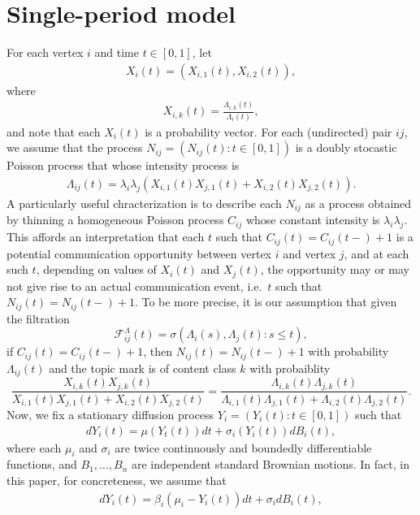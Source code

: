 \documentclass[12pt]{article}%
\begin{document}
\section{Single-period model}
For each vertex $i$ and time $t\in[0,1]$, let 
\begin{eqnarray}
X_i(t) = (X_{i,1}(t), X_{i,2}(t)),
\end{eqnarray}
where
\begin{eqnarray}
X_{i,k}(t) = \frac{\Lambda_{i,k}(t)}{\Lambda_i(t)},
\end{eqnarray}
and note that each $X_i(t)$ is a probability vector. 
For each (undirected) pair $ij$, we assume that 
the process $N_{ij} = (N_{ij}(t):t\in[0,1])$ is   
a doubly stocastic Poisson process that whose intensity process is  
\begin{eqnarray}
\Lambda_{ij}(t) = \lambda_i \lambda_j (X_{i,1}(t)X_{j,1}(t) + X_{i,2}(t)X_{j,2}(t)).
\end{eqnarray}
A particularly useful chracterization is to describe each $N_{ij}$ as a process obtained 
by thinning a homogeneous Poisson process $C_{ij}$ whose constant intensity is $\lambda_i \lambda_j$.  
This affords an interpretation that each $t$ such that $C_{ij}(t) = C_{ij}(t-) +1$ 
is a potential communication opportunity between vertex $i$ and vertex $j$, 
and at each such $t$, depending on values of $X_i(t)$ and $X_j(t)$, 
the opportunity may or may not give rise to an actual communication event, i.e.\ $t$ such that $N_{ij}(t) = N_{ij}(t-) +1$. To be more precise, it is our assumption that given the filtration 
$$
\mathcal F_{ij}^\Lambda(t) = \sigma(\Lambda_i(s), \Lambda_j(t): s \le t), 
$$
if $C_{ij}(t) = C_{ij}(t-)+1$, then
$N_{ij}(t) = N_{ij}(t-) + 1$ with probability $\Lambda_{ij}(t)$ and the topic mark is of content class $k$ with probaiblity 
$$
\frac{X_{i,k}(t)X_{j,k}(t)}{X_{i,1}(t)X_{j,1}(t) + X_{i,2}(t)X_{j,2}(t)}
=
\frac{\Lambda_{i,k}(t)\Lambda_{j,k}(t)}{\Lambda_{i,1}(t)\Lambda_{j,1}(t) + \Lambda_{i,2}(t)\Lambda_{j,2}(t)}.
$$
Now, we fix a stationary diffusion process $Y_i=(Y_i(t):t\in [0,1])$ such that  
\begin{eqnarray}
dY_i(t) = \mu(Y_t(t)) dt + \sigma_i(Y_i(t)) dB_i(t),
\end{eqnarray}
where each $\mu_i$ and $\sigma_i$ are twice continuously and boundedly differentiable functions, and $B_1,\ldots,B_n$ are independent standard Brownian motions.
In fact, in this paper, for concreteness, we assume that 
\begin{eqnarray}
dY_i(t) = \beta_i (\mu_i - Y_i(t)) dt + \sigma_i dB_i(t),
\end{eqnarray}
\end{document}
